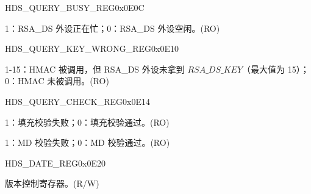 \begin{register}{H}{DS\_QUERY\_BUSY\_REG}{0x0E0C}\label{regdesc:DSQUERYBUSYREG}
%
%
\regnewline%
\begin{regdesc}\begin{reglist}
\item [DS\_QUERY\_BUSY] 1：RSA\_DS 外设正在忙；0：RSA\_DS 外设空闲。(RO)
\end{reglist}\end{regdesc}
\end{register}



\begin{register}{H}{DS\_QUERY\_KEY\_WRONG\_REG}{0x0E10}\label{regdesc:DSQUERYKEYWRONGREG}
%
%
\regnewline%
\begin{regdesc}\begin{reglist}
\item [DS\_QUERY\_KEY\_WRONG] 1-15：HMAC 被调用，但 RSA\_DS 外设未拿到 \begin{math}RSA\_DS\_KEY\end{math}（最大值为 15）；0：HMAC 未被调用。(RO)
\end{reglist}\end{regdesc}
\end{register}




\begin{register}{H}{DS\_QUERY\_CHECK\_REG}{0x0E14}\label{regdesc:DSQUERYCHECKREG}
%
%
%
\regnewline%
\begin{regdesc}\begin{reglist}
\item [DS\_PADDING\_BAD] 1：填充校验失败；0：填充校验通过。(RO)
\item [DS\_MD\_ERROR] 1：MD 校验失败；0：MD 校验通过。(RO)
\end{reglist}\end{regdesc}
\end{register}




\begin{register}{H}{DS\_DATE\_REG}{0x0E20}\label{regdesc:DSDATEREG}
%
%
\regnewline%
\begin{regdesc}\begin{reglist}
\item [DS\_DATE] 版本控制寄存器。(R/W)
\end{reglist}\end{regdesc}
\end{register}
